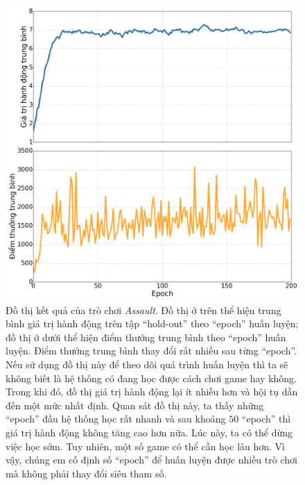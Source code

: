 	\begin{figure}
		\centering
		\includegraphics[width=\textwidth]{dqn_assault_values_rewards}
		\caption[Đồ thị giá trị hành động trung bình và điểm thưởng trung bình]{
		Đồ thị kết quả của trò chơi \textit{Assault}. 
		Đồ thị ở trên thể hiện trung bình giá trị hành động trên tập ``hold-out'' theo ``epoch'' huấn luyện; đồ thị ở dưới thể hiện điểm thưởng trung bình theo ``epoch'' huấn luyện.
		Điểm thưởng trung bình thay đổi rất nhiều sau từng ``epoch''.
		Nếu sử dụng đồ thị này để theo dõi quá trình huấn luyện thì ta sẽ không biết là hệ thống có đang học được cách chơi game hay không.
		Trong khi đó, đồ thị giá trị hành động lại ít nhiễu hơn và hội tụ dần đến một mức nhất định.
		Quan sát đồ thị này, ta thấy những ``epoch'' đầu hệ thống học rất nhanh và sau khoảng $50$ ``epoch'' thì giá trị hành động không tăng cao hơn nữa.
		Lúc này, ta có thể dừng việc học sớm.
		Tuy nhiên, một số game có thể cần học lâu hơn.
		Vì vậy, chúng em cố định số ``epoch'' để huấn luyện được nhiều trò chơi mà không phải thay đổi siêu tham số.}
		\label{fig_assault_vr}
	\end{figure}
	
